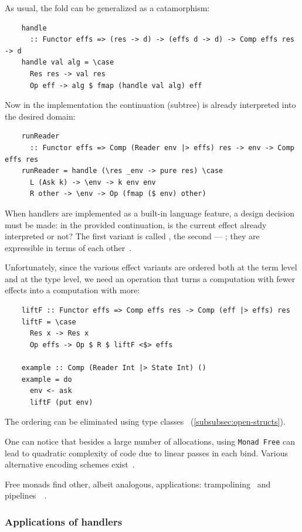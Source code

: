 As usual, the fold can be generalized as a catamorphism:
\begin{verbatim}
    handle
      :: Functor effs => (res -> d) -> (effs d -> d) -> Comp effs res -> d
    handle val alg = \case
      Res res -> val res
      Op eff -> alg $ fmap (handle val alg) eff
\end{verbatim}
Now in the implementation the continuation (subtree) is already interpreted into the desired domain:
\begin{verbatim}
    runReader
      :: Functor effs => Comp (Reader env |> effs) res -> env -> Comp effs res
    runReader = handle (\res _env -> pure res) \case
      L (Ask k) -> \env -> k env env
      R other -> \env -> Op (fmap ($ env) other)
\end{verbatim}

When handlers are implemented as a built-in language feature, a design decision must be made: in the provided continuation, is the current effect already interpreted or not?
The first variant is called , the second --- ; they are expressible in terms of each other~\cite{hillerstrom2018shallow}.

Unfortunately, since the various effect variants are ordered both at the term level and at the type level, we need an operation that turns a computation with fewer effects into a computation with more:
\begin{verbatim}
    liftF :: Functor effs => Comp effs res -> Comp (eff |> effs) res
    liftF = \case
      Res x -> Res x
      Op effs -> Op $ R $ liftF <$> effs

    example :: Comp (Reader Int |> State Int) ()
    example = do
      env <- ask
      liftF (put env)
\end{verbatim}
The ordering can be eliminated using type classes~\cite{swierstra2008data} (\ref{subsubsec:open-structs}).

One can notice that besides a large number of allocations, using \texttt{Monad Free} can lead to quadratic complexity of code due to linear passes in each bind.
Various alternative encoding schemes exist~\cite{ploeg2014reflection, kiselyov2015freer}.

Free monads find other, albeit analogous, applications: trampolining~\cite{bjarnarson2012stackless} and pipelines~\cite{kiselyov2012iteratees}~\cite[chapter 14]{bragilevsky-haskell}.

\subsubsection{Applications of handlers} \label{subsubsec:handler-applications}

